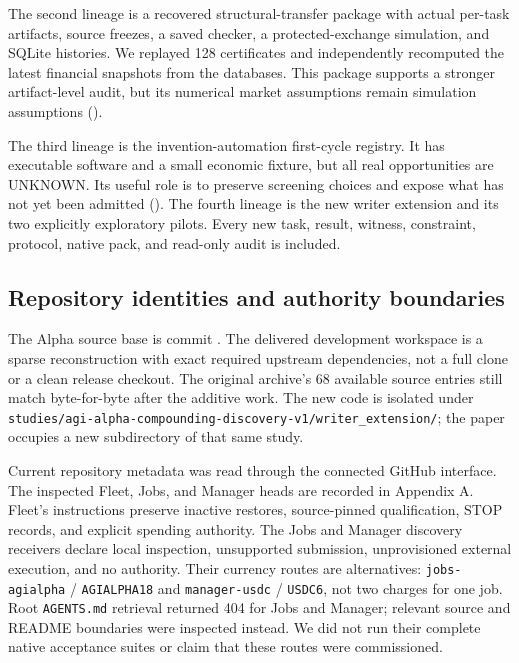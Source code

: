 The second lineage is a recovered structural-transfer package with
actual per-task artifacts, source freezes, a saved checker, a
protected-exchange simulation, and SQLite histories. We replayed 128
certificates and independently recomputed the latest financial snapshots
from the databases. This package supports a stronger artifact-level
audit, but its numerical market assumptions remain simulation
assumptions ().

The third lineage is the invention-automation first-cycle registry. It
has executable software and a small economic fixture, but all real
opportunities are UNKNOWN. Its useful role is to preserve screening
choices and expose what has not yet been admitted
(). The
fourth lineage is the new writer extension and its two explicitly
exploratory pilots. Every new task, result, witness, constraint,
protocol, native pack, and read-only audit is included.

\subsection{Repository identities and authority
boundaries}\label{repository-identities-and-authority-boundaries}

The Alpha source base is commit
. The delivered
development workspace is a sparse reconstruction with exact required
upstream dependencies, not a full clone or a clean release checkout. The
original archive's 68 available source entries still match byte-for-byte
after the additive work. The new code is isolated under
\texttt{studies/agi-alpha-compounding-discovery-v1/writer\_extension/};
the paper occupies a new subdirectory of that same study.

Current repository metadata was read through the connected GitHub
interface. The inspected Fleet, Jobs, and Manager heads are recorded in
Appendix A. Fleet's instructions preserve inactive restores,
source-pinned qualification, STOP records, and explicit spending
authority. The Jobs and Manager discovery receivers declare local
inspection, unsupported submission, unprovisioned external execution,
and no authority. Their currency routes are alternatives:
\texttt{jobs-agialpha} / \texttt{AGIALPHA18} and \texttt{manager-usdc} /
\texttt{USDC6}, not two charges for one job. Root \texttt{AGENTS.md}
retrieval returned 404 for Jobs and Manager; relevant source and README
boundaries were inspected instead. We did not run their complete native
acceptance suites or claim that these routes were commissioned.


